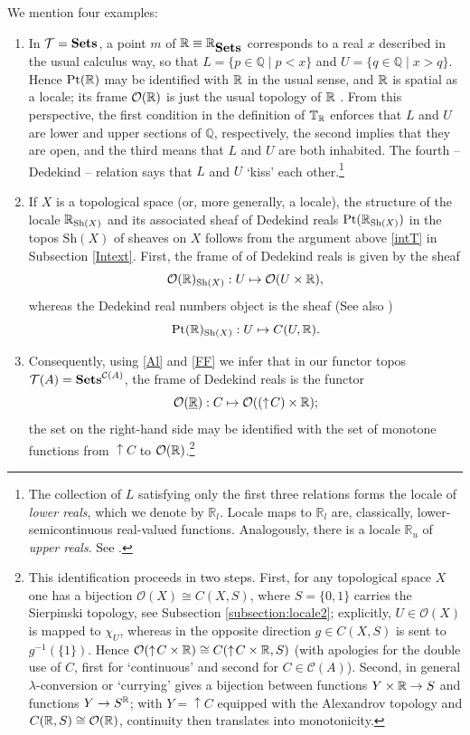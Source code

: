 \documentclass[12pt]{article}
\newcommand{\Q}{\mathbb{Q}}
\newcommand{\beq}{\begin{equation}}
\newcommand{\eeq}{\end{equation}}
\newcommand{\Sets}{\mbox{\textbf{Sets}}}
\newcommand{\raw}{\rightarrow} \newcommand{\rat}{\mapsto}
\newcommand{\x}{\times} \newcommand{\hb}{\hbar}
\newcommand{\er}{\eqref}
\newcommand{\CA}{{\mathcal A}} \newcommand{\CB}{{\mathcal B}}
\newcommand{\CO}{{\mathcal O}} \newcommand{\CP}{{\mathcal P}}
\newcommand{\CT}{{\mathcal T}} \newcommand{\CV}{{\mathcal V}}
\newcommand{\T}{{\mathbb T}} \newcommand{\Z}{{\mathbb Z}}
\newcommand{\alg}[1]{\ensuremath{#1}}
\newcommand{\Sh}{\ensuremath{\mathrm{Sh}}}
\newcommand{\context}{\ensuremath{\mathcal{C}}}
\newcommand{\asstopos}{\ensuremath{\mathcal{T}}}
\newcommand{\field}[1]{\ensuremath{\mathbb{#1}}}
\renewcommand{\CA}{\mathcal{C}(A)}
\newcommand{\TA}{\mathcal{T}(A)}
\renewcommand{\TA}{\asstopos(\alg{A})}
\renewcommand{\CA}{\context(\alg{A})}
\begin{document}
We mention four examples:
\begin{enumerate}
  \item In $\CT= \Sets$, 
   a point $m$ of $\R\equiv \R_{\Sets}$ corresponds to a real
    $x$ described in the usual calculus way, so that $L= \{p\in\Q\mid
    p<x\}$ and $U=\{q\in\Q\mid x>q\}$. Hence  $\mathrm{Pt}({\mathbb R})$ may
    be identified with ${\mathbb R}$ in the usual sense, and ${\mathbb R}$ is spatial
    as a locale; its frame  $\CO(\R)$ is just the usual topology of ${\mathbb R}$
        \cite[D4.7.4]{johnstone02b}.
    From this perspective, the first
    condition in the definition of $\T_{\R}$  enforces that $L$ and $U$ are lower and upper
    sections of $\Q$, respectively, the second implies that they are
    open, and the third means that $L$ and $U$ are both inhabited. The fourth -- Dedekind --
    relation says that $L$ and $U$ `kiss' each other.\footnote{The collection of $L$ satisfying only the first three relations
    forms the locale of \emph{lower reals}, which we denote by
    $\field{R}_l$. Locale maps to $\field{R}_l$ are, classically,
    lower-semicontinuous real-valued functions. Analogously, there is
    a locale $\field{R}_u$ of \emph{upper reals}. See \cite{johnstone02b}.}

  \item If $X$ is a topological space (or, more generally, a locale), the structure of the locale
  $\R_{\Sh(X)}$ and its associated sheaf of Dedekind reals $\mathrm{Pt}(\R_{\Sh(X)})$
     in the topos $\Sh(X)$ of
    sheaves on $X$ follows from the argument above \er{intT} in Subsection \ref{Intext}.
    First, the frame of of Dedekind reals is given by the sheaf
\beq \CO(\R)_{\Sh(X)}: U\mapsto \CO(U\x \R),\eeq
whereas the Dedekind real numbers object is the sheaf (See also \cite{maclanemoerdijk92})
\beq \mathrm{Pt}(\R)_{\Sh(X)}: U\mapsto C(U,\R).\label{DRN}\eeq
 \item
 Consequently, using \er{Al} and \er{FF} we infer that
    in our functor topos  $\TA=\Sets^{\CA}$,   the frame  of Dedekind reals is the functor
    \beq
    \CO(\underline{\R}):
    C\mapsto \CO((\uparrow\! C)\x \R); \label{ddr}\eeq
   the set on the right-hand side may be identified with the set of monotone functions from $\uparrow\! C$ to $\CO(\R)$.\footnote{\label{monotone} This identification proceeds in two steps. First, for any topological space $X$ one has a bijection $\CO(X)\cong C(X, S)$, where $S=\{0,1\}$ carries the Sierpinski topology, see Subsection \ref{subsection:locale2}; explicitly,
 $U\in\CO(X)$ is mapped to  $\chi_U$, whereas in the opposite direction $g\in C(X, S)$
   is sent to  $g^{-1}(\{1\})$.
Hence $\CO(\uparrow\!C \x \R) \cong C(\uparrow\!C \x \R, S)$ (with apologies for the double use of $C$, first for `continuous' and second for $C\in\CA$). Second, in general $\lambda$-conversion or `currying' gives a  bijection between functions $Y \x \R\raw S$ and  functions 
$Y\raw S^{\R}$; with $Y=\uparrow\!C$ equipped with the Alexandrov topology and $C(\R,S)\cong \CO(\R)$,  continuity then translates into monotonicity.}
    

\end{enumerate}
\end{document}
